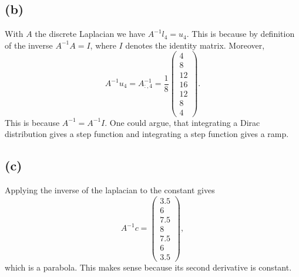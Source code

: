 \subsection*{(b)}
With $A$ the discrete Laplacian we have $A^{-1} l_4 = u_4$. This is because by definition of the inverse $A^{-1} A = I$, where $I$ denotes the identity matrix. Moreover,
\[
A^{-1} u_4 = A^{-1}_{:, 4} = \frac{1}{8} \left( \begin{matrix} 4 \\ 8 \\ 12 \\ 16 \\ 12 \\ 8 \\ 4 \end{matrix} \right).
\]
This is because $A^{-1} = A^{-1} I$. One could argue, that integrating a Dirac distribution gives a step function and integrating a step function gives a ramp.

\subsection*{(c)}
Applying the inverse of the laplacian to the constant gives
\[
A^{-1} c = \left( \begin{matrix} 3.5 \\ 6 \\ 7.5 \\ 8 \\ 7.5 \\ 6 \\ 3.5 \end{matrix} \right),
\]
which is a parabola. This makes sense because its second derivative is constant.

